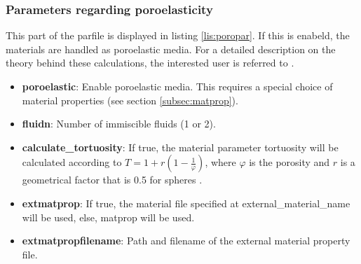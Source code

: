     	\subsubsection{Parameters regarding poroelasticity}
			This part of the parfile is displayed in listing \ref{lis:poropar}. If this is enabeld, the materials are handled as poroelastic media. For a detailed description on the theory behind these calculations, the interested user is referred to \cite{Boxberg.2019}.
			
    		\begin{itemize}
    			\item \textbf{poroelastic}: Enable poroelastic media. This requires a special choice of material properties (see section \ref{subsec:matprop}).
    			\item \textbf{fluidn}: Number of immiscible fluids (1 or 2).
    			\item \textbf{calculate\_tortuosity}: If true, the material parameter tortuosity will be calculated according to $T = 1+r\left(1-\frac{1}{\varphi}\right)$, where $\varphi$ is the porosity and $r$ is a geometrical factor that is 0.5 for spheres \citep[see][for more information]{Boxberg.2019}.
    			\item \textbf{extmatprop}: If true, the material file specified at external\_material\_name will be used, else, matprop will be used.
    			\item \textbf{extmatpropfilename}: Path and filename of the external material property file.
    		\end{itemize}		

